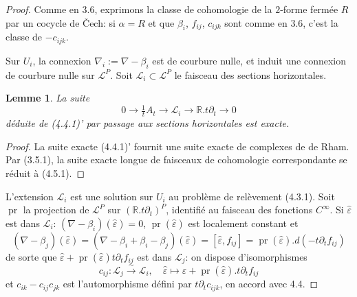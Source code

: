\documentclass[11pt,a4paper]{article}
\theoremstyle{plain}
\newtheorem{lemma}[theorem]{Lemme}
\theoremstyle{definition}
\DeclareMathOperator{\pr}{pr}
\newcommand{\R}{\mathbb{R}}
\newcommand{\iso}{\xrightarrow{\sim}}
\begin{document}
\begin{proof}
Comme en 3.6, exprimons la classe de cohomologie de la $2$-forme ferm\'ee $R$
par un cocycle de \v{C}ech: si $\alpha = R$ et que $\beta_{i}$, $f_{ij}$, $c_{ijk}$ sont comme en 3.6, c'est la classe de $-c_{ijk}$.

Sur $U_{i}$, la connexion $\nabla_{i} := \nabla - \beta_{i}$ est de courbure nulle, et induit une connexion de courbure nulle sur $\mathcal{L}^{P}$. Soit $\mathcal{L}_{i} \subset \mathcal{L}^{P}$ le faisceau des sections horizontales.

\begin{lemma}
La suite
\begin{equation}
0 \longrightarrow \tfrac{1}{t}A_{t} \longrightarrow \mathcal{L}_{i} \longrightarrow \R.t\partial_{t} \longrightarrow 0 \tag{4.5.1}
\end{equation}
d\'eduite de (4.4.1)' par passage aux sections horizontales est exacte.
\end{lemma}

\begin{proof}
La suite exacte (4.4.1)' fournit une suite exacte de complexes de de Rham.
Par (3.5.1), la suite exacte longue de faisceaux de cohomologie correspondante se
r\'eduit \`a (4.5.1).
\end{proof}

L'extension $\mathcal{L}_{i}$ est une solution sur $U_{i}$ au probl\`eme de rel\`evement (4.3.1). Soit $\pr$ la projection de $\mathcal{L}^{P}$ sur $(\R.t\partial_{t})^{P}$, identifi\'e au faisceau des fonctions $C^{\infty}$. Si $\hat{\varepsilon}$ est dans $\mathcal{L}_{i}$:
$(\nabla - \beta_{i})(\hat{\varepsilon}) = 0$,
$\pr(\hat{\varepsilon})$ est localement constant et
\[
(\nabla - \beta_{j})(\hat{\varepsilon}) = (\nabla - \beta_{i} + \beta_{i} - \beta_{j})(\hat{\varepsilon}) = [\hat{\varepsilon}, f_{ij}] = \pr(\hat{\varepsilon}).d(-t\partial_{t} f_{ij})
\]
de sorte que $\hat{\varepsilon} + \pr(\hat{\varepsilon}) t\partial_{t} f_{ij}$ est dans $\mathcal{L}_{j}$: on dispose d'isomorphismes
\[
c_{ij}: \mathcal{L}_{j} \iso \mathcal{L}_{i}, \quad \hat{\varepsilon} \longmapsto \hat{\varepsilon} + \pr(\hat{\varepsilon}).t\partial_{t} f_{ij}
\]
et $c_{ik} - c_{ij}c_{jk}$ est l'automorphisme d\'efini par $t\partial_{t}c_{ijk}$, en accord avec 4.4.
\end{proof}
\end{document}
